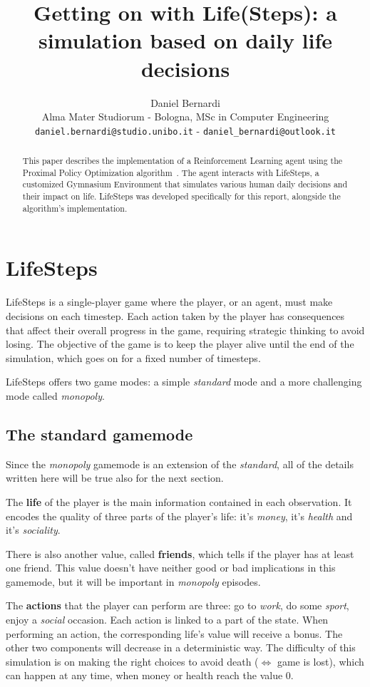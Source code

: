 \documentclass{article}
\title{Getting on with Life(Steps): a simulation based on daily life decisions}
\author{%
  Daniel Bernardi\\
  Alma Mater Studiorum - Bologna, MSc in Computer Engineering\\
  \texttt{daniel.bernardi@studio.unibo.it} - \texttt{daniel\_bernardi@outlook.it}
}
\begin{document}
\maketitle

\begin{abstract}
This paper describes the implementation of a Reinforcement Learning agent using the Proximal Policy Optimization algorithm~\citep{DBLP:journals/corr/SchulmanWDRK17}. The agent interacts with LifeSteps, a customized Gymnasium Environment that simulates various human daily decisions and their impact on life. LifeSteps was developed specifically for this report, alongside the algorithm's implementation.
\end{abstract}


\section{LifeSteps}
LifeSteps is a single-player game where the player, or an agent, must make decisions on each timestep. Each action taken by the player has consequences that affect their overall progress in the game, requiring strategic thinking to avoid losing. The objective of the game is to keep the player alive until the end of the simulation, which goes on for a fixed number of timesteps. 

LifeSteps offers two game modes: a simple \textit{standard} mode and a more challenging mode called \textit{monopoly}.

\subsection{The standard gamemode}
Since the \textit{monopoly} gamemode is an extension of the \textit{standard}, all of the details written here will be true also for the next section.

The \textbf{life} of the player is the main information contained in each observation. It encodes the quality of three parts of the player's life: it's \textit{money}, it's \textit{health} and it's \textit{sociality}.

There is also another value, called \textbf{friends}, which tells if the player has at least one friend. This value doesn't have neither good or bad implications in this gamemode, but it will be important in \textit{monopoly} episodes. 

The \textbf{actions} that the player can perform are three: go to \textit{work}, do some \textit{sport}, enjoy a \textit{social} occasion. 
Each action is linked to a part of the state. When performing an action, the corresponding life's value will receive a bonus. The other two components will decrease in a deterministic way. 
The difficulty of this simulation is on making the right choices to avoid death (\(\Leftrightarrow\) game is lost), which can happen at any time, when money or health reach the value 0. 
\end{document}
